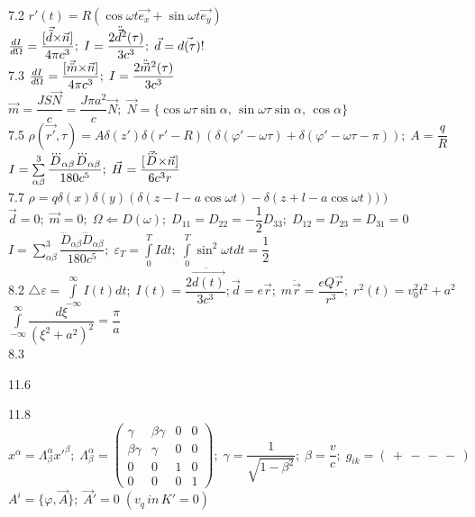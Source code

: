 \num{7.2}
$r'(t) = R(\cos \omega t \vec{e_x} + \sin \omega t \vec{e_y})$\\
$\frac{d I}{d \Omega}=\dfrac{[\vec{\ddot{d}}{\times}\vec{n}]}{4\pi c^3};\; I = \dfrac{2\ddot{\vec{d}}^2(\tau)}{3c^3};\; \vec{d} = \vec{d(\tau)}! $\\

\num{7.3}
$\frac{d I}{d \Omega}=\dfrac{[\vec{\ddot{m}}{\times}\vec{n}]}{4\pi c^3};\; I = \dfrac{2\ddot{\vec{m}}^2(\tau)}{3c^3}$\\
$\vec{m} = \dfrac{JS\vec{N}}{c} = \dfrac{J\pi a^2}{c}\vec{N};\; \vec{N} = \{\cos\omega\tau \sin\alpha,\,\sin\omega\tau\sin\alpha,\,\cos\alpha \}$\\

\num{7.5}
$\rho(\vec{r'},\tau) = A \delta(z')\delta(r'-R)\left(\delta(\varphi'-\omega\tau)+\delta(\varphi'-\omega\tau-\pi) \right);\; A = \dfrac{q}{R}$\\
$I = \sum\limits_{\alpha\beta}^3 \dfrac{\dddot{D}_{\alpha\beta} \dddot{D}_{\alpha\beta}}{180c^5};\;\vec{H}=\dfrac{[\vec{\dddot{D}}{\times}\vec{n}]}{6c^3 r} $\\

\num{7.7}
$\rho = q \delta(x) \delta(y) \left( \delta(z-l-a\cos{\omega t}) - \delta(z+l-a\cos{\omega t})) \right)$\\
$\vec{d} = 0;\; \vec{m} = 0;\; \Omega \Leftarrow D(\omega);\; D_{11}=D_{22}=-\dfrac1{2}D_{33};\;D_{12}=D_{23}=D_{31}=0$\\
$I = \sum\limits_{\alpha\beta}^3 \dfrac{\dddot{D}_{\alpha\beta} \dddot{D}_{\alpha\beta}}{180c^5};\; \varepsilon_T = \int\limits_0^T I dt;\; \int\limits_0^T \sin^2 \omega t dt = \dfrac{1}{2}$\\

\num{8.2}
$\triangle \varepsilon = \int\limits_{-\infty}^\infty I(t)dt;\; I(t) = \dfrac{2\ddot{\vec{d(t)}}}{3c^3}; \vec{d}=e\vec{r};\;m\ddot{\vec{r}}=\dfrac{eQ\vec{r}}{r^3};\;r^2(t)=v_0^2 t^2 + a^2$\\
$\int\limits_{-\infty}^\infty \dfrac{d\xi}{(\xi^2+a^2)^2} = \dfrac{\pi}{a}$\\

\num{8.3}

\num{11.6}



\num{11.8}
$x^\alpha = \Lambda^\alpha_\beta {x'}^\beta ;\; \Lambda^\alpha_\beta =
\begin{pmatrix}\gamma & \beta\gamma & 0 & 0 \\ \beta\gamma & \gamma & 0 & 0 \\ 0 & 0 & 1 & 0 \\ 0 & 0 & 0 & 1 \end{pmatrix};\;\gamma = \dfrac1{\sqrt{1-\beta^2}};\;\beta=\dfrac{v}{c};\;g_{ik}=(\,+\,-\,-\,-\,)$\\
$A^i = \{\varphi, \vec{A} \};\; \vec{A}'=0\; (v_q\, in\, K' = 0) $\\

